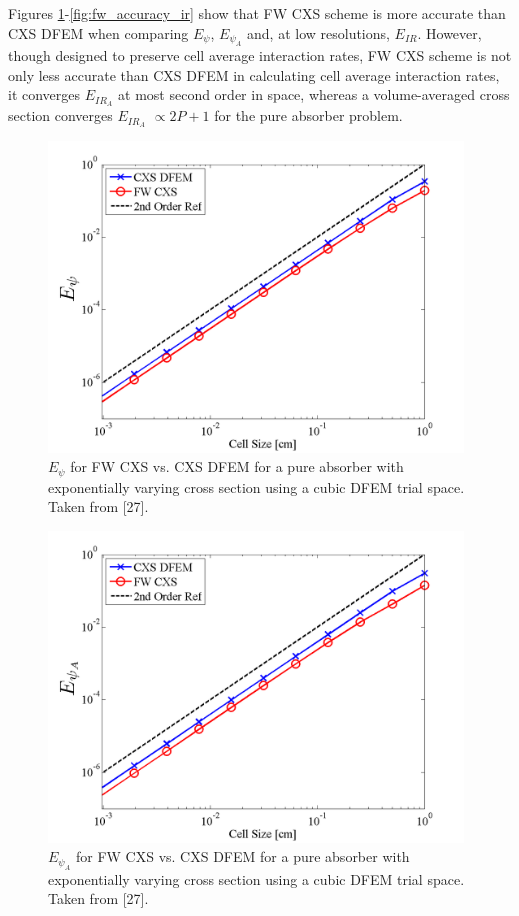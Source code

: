 Figures \ref{fig:fw_accuracy_psi}-\ref{fig:fw_accuracy_ir} show that FW CXS scheme is more accurate than CXS DFEM when comparing $E_{\psi}$, $E_{\psi_A}$ and, at low resolutions, $E_{IR}$.
However, though designed to preserve cell average interaction rates, FW CXS scheme is not only less accurate than  CXS DFEM in calculating cell average interaction rates, it converges $E_{IR_A}$ at most second order in space, whereas a volume-averaged cross section converges $E_{IR_A}$ $\propto 2P+1$ for the pure absorber problem.
%
%
\begin{figure}[!htp]
\centering
\includegraphics[width=11cm]{chapter3_variable_xs/FW_XS_P3_VarXS_E_psi_L2.png}
\caption{$E_{\psi}$ for FW CXS vs. CXS DFEM for a pure absorber with exponentially varying cross section using a cubic DFEM trial space.  Taken from [27].}
\label{fig:fw_accuracy_psi}
\end{figure}
%
%
\begin{figure}[!hbp]
\centering
\includegraphics[width=11cm]{chapter3_variable_xs/FW_XS_P3_VarXS_E_psi_A.png}
\caption{$E_{\psi_A}$ for FW CXS vs. CXS DFEM for a pure absorber with exponentially varying cross section using a cubic DFEM trial space.  Taken from [27].}
\label{fig:fw_accuracy_psi_a}
\end{figure}
